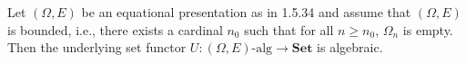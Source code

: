 Let $(\Omega, E)$ be an equational presentation as in 1.5.34 and assume that $(\Omega, E)$ is bounded, i.e., there exists a cardinal $n_0$ such that for all $n \geqslant n_0$, $\Omega_n$ is empty. Then the underlying set functor $U: (\Omega, E)\text{-alg} \longrightarrow \mathbf{Set}$ is algebraic.
